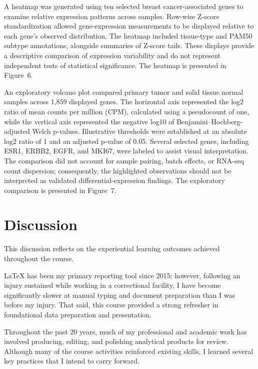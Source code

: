 \documentclass[12pt,letterpaper]{article}
\begin{document}
A heatmap was generated using ten selected breast cancer-associated genes to examine relative expression patterns across samples. Row-wise Z-score standardization allowed gene-expression measurements to be displayed relative to each gene's observed distribution. The heatmap included tissue-type and PAM50 subtype annotations, alongside summaries of Z-score tails. These displays provide a descriptive comparison of expression variability and do not represent independent tests of statistical significance. The heatmap is presented in Figure~6.

An exploratory volcano plot compared primary tumor and solid tissue normal samples across 1,859 displayed genes. The horizontal axis represented the log2 ratio of mean counts per million (CPM), calculated using a pseudocount of one, while the vertical axis represented the negative log10 of Benjamini--Hochberg-adjusted Welch p-values. Illustrative thresholds were established at an absolute log2 ratio of 1 and an adjusted p-value of 0.05. Several selected genes, including ESR1, ERBB2, EGFR, and MKI67, were labeled to assist visual interpretation. The comparison did not account for sample pairing, batch effects, or RNA-seq count dispersion; consequently, the highlighted observations should not be interpreted as validated differential-expression findings. The exploratory comparison is presented in Figure~7.

\section*{Discussion}

This discussion reflects on the experiential learning outcomes achieved throughout the course.

LaTeX has been my primary reporting tool since 2015; however, following an injury sustained while working in a correctional facility, I have become significantly slower at manual typing and document preparation than I was before my injury. That said, this course provided a strong refresher in foundational data preparation and presentation.

Throughout the past 20 years, much of my professional and academic work has involved producing, editing, and polishing analytical products for review. Although many of the course activities reinforced existing skills, I learned several key practices that I intend to carry forward.
\end{document}
